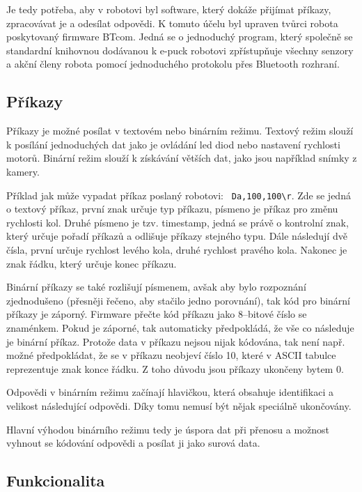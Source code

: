 \documentclass[12pt,notitlepage]{report}
\begin{document}
    Je tedy potřeba, aby v robotovi byl software, který dokáže přijímat
    příkazy, zpracovávat je a odesílat odpovědi. K tomuto účelu byl upraven
    tvůrci robota poskytovaný firmware BTcom. Jedná se o jednoduchý program,
    který společně se standardní knihovnou dodávanou k e-puck robotovi
    zpřístupňuje všechny senzory a akční členy robota pomocí jednoduchého
    protokolu přes Bluetooth rozhraní.

    \subsection{Příkazy}

    Příkazy je možné posílat v textovém nebo binárním režimu. Textový režim
    slouží k posílání jednoduchých dat jako je ovládání led diod nebo nastavení
    rychlosti motorů. Binární režim slouží k získávání větších dat, jako jsou
    například snímky z kamery.

    Příklad jak může vypadat příkaz poslaný robotovi: {\tt
    Da,100,100\textbackslash r}. Zde se jedná o textový příkaz, první znak
    určuje typ příkazu, písmeno  je příkaz pro změnu rychlosti kol. Druhé
    písmeno je tzv. timestamp, jedná se právě o kontrolní znak, který určuje
    pořadí příkazů a odlišuje příkazy stejného typu. Dále následují dvě čísla,
    první určuje rychlost levého kola, druhé rychlost pravého kola. Nakonec je
    znak řádku, který určuje konec příkazu.

    Binární příkazy se také rozlišují písmenem, avšak aby bylo rozpoznání
    zjednodušeno (přesněji řečeno, aby stačilo jedno porovnání), tak kód pro
    binární příkazy je záporný. Firmware přečte kód příkazu jako 8--bitové
    číslo se znaménkem. Pokud je záporné, tak automaticky předpokládá, že vše
    co následuje je binární příkaz. Protože data v příkazu nejsou nijak
    kódována, tak není např. možné předpokládat, že se v příkazu neobjeví číslo
    10, které v ASCII tabulce reprezentuje znak konce řádku. Z toho důvodu jsou
    příkazy ukončeny bytem 0.

    Odpovědi v binárním režimu začínají hlavičkou, která obsahuje identifikaci
    a velikost následující odpovědi. Díky tomu nemusí být nějak speciálně
    ukončovány.

    Hlavní výhodou binárního režimu tedy je úspora dat při přenosu a možnost
    vyhnout se kódování odpovědi a posílat ji jako surová data.

    \subsection{Funkcionalita}
\end{document}
